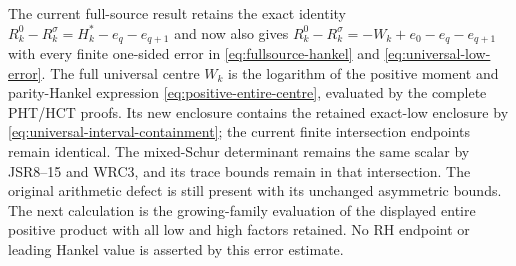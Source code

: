 The current full-source result retains the exact identity
$R_k^0-R_k^\sigma=H_k^*-e_q-e_{q+1}$ and now also gives
$R_k^0-R_k^\sigma=-W_k+e_0-e_q-e_{q+1}$ with every finite
one-sided error in \eqref{eq:fullsource-hankel} and
\eqref{eq:universal-low-error}. The full universal centre
$W_k$ is the logarithm of the positive moment and parity-Hankel expression
\eqref{eq:positive-entire-centre}, evaluated by the complete
PHT/HCT proofs. Its new enclosure contains the retained
exact-low enclosure by \eqref{eq:universal-interval-containment};
the current finite intersection endpoints remain identical.
The mixed-Schur determinant remains the same scalar by
JSR8--15 and WRC3, and its trace bounds remain in that intersection.
The original arithmetic defect is still present with its
unchanged asymmetric bounds. The next calculation is the
growing-family evaluation of the displayed entire positive
product with all low and high factors retained. No RH endpoint
or leading Hankel value is asserted by this error estimate.